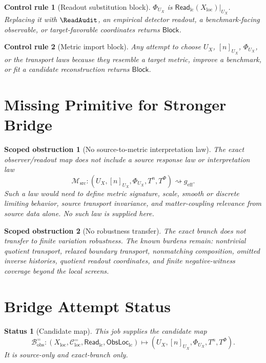 \documentclass[11pt]{article}
\newcommand{\ReadLC}{\mathsf{Read}_{\mathrm{lc}}}
\newcommand{\ObsLocLC}{\mathsf{ObsLoc}_{\mathrm{lc}}}
\newcommand{\geff}{g_{\mathrm{eff}}}
\newcommand{\Block}{\mathsf{Block}}
\newtheorem{obstruction}{Scoped obstruction}
\newtheorem{status}{Status}
\newtheorem{controlrule}{Control rule}
\begin{document}
\begin{controlrule}[Readout substitution block]
\(\Phi_{U_X}\) is \(\ReadLC(X_{\mathrm{loc}})|_{U_X}\). Replacing it
with \(\ReadAudit\), an empirical detector readout, a benchmark-facing
observable, or target-favorable coordinates returns \(\Block\).
\end{controlrule}

\begin{controlrule}[Metric import block]
Any attempt to choose \(U_X\), \([n]_{U_X}\), \(\Phi_{U_X}\), or the
transport laws because they resemble a target metric, improve a
benchmark, or fit a candidate reconstruction returns \(\Block\).
\end{controlrule}

\section{Missing Primitive for Stronger Bridge}

\begin{obstruction}[No source-to-metric interpretation law]
The exact observer/readout map does not include a source response law
or interpretation law
\[
    \mathcal{M}_{\mathrm{src}}:
    (U_X,[n]_{U_X},\Phi_{U_X},T^n,T^\Phi)
    \rightsquigarrow
    \geff.
\]
Such a law would need to define metric signature, scale, smooth or
discrete limiting behavior, source transport invariance, and
matter-coupling relevance from source data alone. No such law is
supplied here.
\end{obstruction}

\begin{obstruction}[No robustness transfer]
The exact branch does not transfer to finite variation robustness.
The known burdens remain: nontrivial quotient transport, relaxed
boundary transport, nonmatching composition, omitted inverse
histories, quotient readout coordinates, and finite negative-witness
coverage beyond the local screens.
\end{obstruction}

\section{Bridge Attempt Status}

\begin{status}[Candidate map]
This job supplies the candidate map
\[
    \mathcal{B}^{=}_{\mathrm{obs}}
    :
    (X_{\mathrm{loc}},\mathcal{C}^{=}_{\mathrm{loc}},\ReadLC,\ObsLocLC)
    \mapsto
    (U_X,[n]_{U_X},\Phi_{U_X},T^n,T^\Phi).
\]
It is source-only and exact-branch only.
\end{status}
\end{document}

